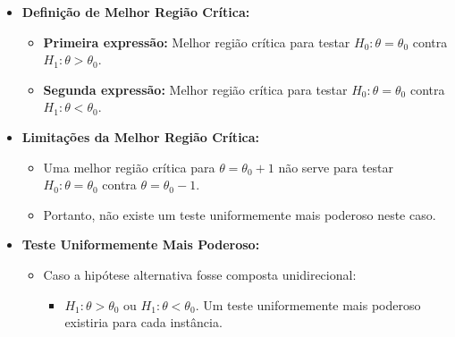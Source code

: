 \documentclass[12pt]{beamer}
\begin{document}
\begin{frame}{}
\begin{block}{}
\justifying

%
\begin{itemize}
	\item \textbf{Definição de Melhor Região Crítica:}
	\begin{itemize}
		\item \textbf{Primeira expressão:} Melhor região crítica para testar $H_0 : \theta = \theta_0$ contra $H_1 : \theta > \theta_0$.\pause
		\item \textbf{Segunda expressão:} Melhor região crítica para testar $H_0 : \theta = \theta_0$ contra $H_1 : \theta < \theta_0$.
	\end{itemize}
	\pause
	\item \textbf{Limitações da Melhor Região Crítica:}
	\begin{itemize}
		\item Uma melhor região crítica para $\theta = \theta_0 + 1$ não serve para testar $H_0 : \theta = \theta_0$ contra $\theta = \theta_0 - 1$.\pause
		\item Portanto, não existe um teste uniformemente mais poderoso neste caso.
	\end{itemize}
	\pause
	\item \textbf{Teste Uniformemente Mais Poderoso:}
	\begin{itemize}
		\item Caso a hipótese alternativa fosse composta unidirecional:
		\begin{itemize}
			\item $H_1 : \theta > \theta_0$ ou $H_1 : \theta < \theta_0$. Um teste uniformemente mais poderoso existiria para cada instância.
		\end{itemize}
	\end{itemize}
\end{itemize}
\end{block}
\end{frame}
\end{document}
